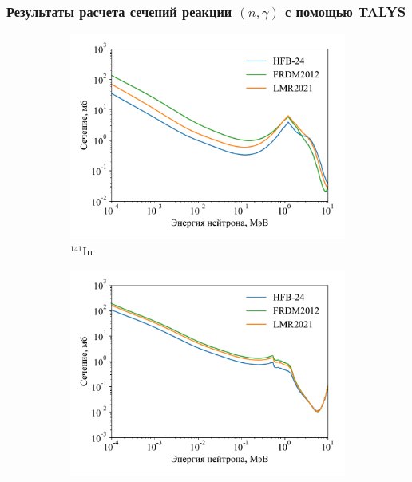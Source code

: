 \subsubsection{Результаты расчета сечений реакции $(n,\gamma)$ с помощью TALYS}

\begin{figure}
  \centering
  \begin{subfigure}{0.48\textwidth}
    \centering
    \includegraphics[width=\textwidth]{pics/cs_in141.pdf}
    \caption{${}^{141}$In}
  \end{subfigure}
  \hfill
  \begin{subfigure}{0.48\textwidth}
    \centering
    \includegraphics[width=\textwidth]{pics/cs_in142.pdf}

\end{subfigure}
\end{figure}
